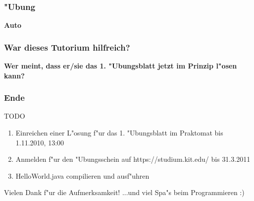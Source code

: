 \documentclass{beamer}
\begin{document}
\begin{frame}
\frametitle{"Ubung}
\begin{center}
\textbf{\Huge Auto}
\end{center}
\end{frame}


\begin{frame}
\frametitle{War dieses Tutorium hilfreich?}
\begin{center}
\textbf{\Huge Wer meint, dass er/sie das 1. "Ubungsblatt jetzt im Prinzip l"osen kann?}
\end{center}
\end{frame}


\begin{frame}
\frametitle{Ende}
\begin{block}{TODO}
\begin{enumerate}
\item Einreichen einer L"osung f"ur das 1. "Ubungsblatt im Praktomat bis \alert{1.11.2010, 13:00}
\item Anmelden f"ur den "Ubungsschein auf https://studium.kit.edu/ bis \alert{31.3.2011}
\item HelloWorld.java compilieren und ausf"uhren
\end{enumerate}
\end{block}

\begin{block}{Vielen Dank f"ur die Aufmerksamkeit!}
...und viel Spa"s beim Programmieren :)
\end{block}
\end{frame}
\end{document}
